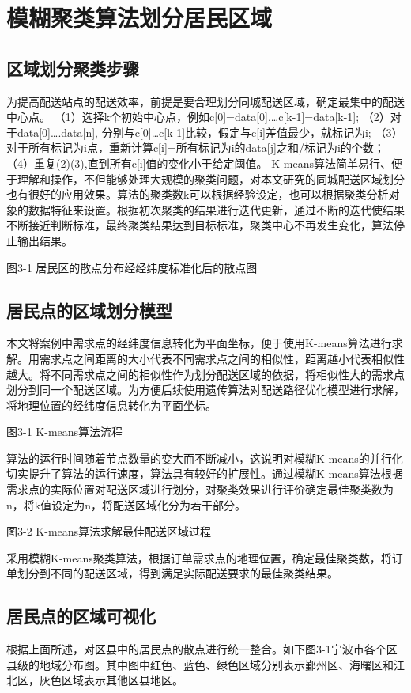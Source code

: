 \clearpage
\section{模糊聚类算法划分居民区域}

\subsection{区域划分聚类步骤}

为提高配送站点的配送效率，前提是要合理划分同城配送区域，确定最集中的配送中心点。
（1）选择k个初始中心点，例如c[0]=data[0],…c[k-1]=data[k-1];
（2）对于data[0]….data[n], 分别与c[0]…c[k-1]比较，假定与c[i]差值最少，就标记为i;
（3）对于所有标记为i点，重新计算c[i]={所有标记为i的data[j]之和}/标记为i的个数；
（4）重复(2)(3),直到所有c[i]值的变化小于给定阈值。
K-means算法简单易行、便于理解和操作，不但能够处理大规模的聚类问题，对本文研究的同城配送区域划分也有很好的应用效果。算法的聚类数k可以根据经验设定，也可以根据聚类分析对象的数据特征来设置。根据初次聚类的结果进行迭代更新，通过不断的迭代使结果不断接近判断标准，最终聚类结果达到目标标准，聚类中心不再发生变化，算法停止输出结果。

 
图3-1 居民区的散点分布经经纬度标准化后的散点图


\subsection{居民点的区域划分模型}

本文将案例中需求点的经纬度信息转化为平面坐标，便于使用K-means算法进行求解。用需求点之间距离的大小代表不同需求点之间的相似性，距离越小代表相似性越大。将不同需求点之间的相似性作为划分配送区域的依据，将相似性大的需求点划分到同一个配送区域。为方便后续使用遗传算法对配送路径优化模型进行求解，将地理位置的经纬度信息转化为平面坐标。
 

图3-1 K-means算法流程

算法的运行时间随着节点数量的变大而不断减小，这说明对模糊K-means的并行化切实提升了算法的运行速度，算法具有较好的扩展性。通过模糊K-means算法根据需求点的实际位置对配送区域进行划分，对聚类效果进行评价确定最佳聚类数为n，将k值设定为n，将配送区域化分为若干部分。

 
图3-2 K-means算法求解最佳配送区域过程

采用模糊K-means聚类算法，根据订单需求点的地理位置，确定最佳聚类数，将订单划分到不同的配送区域，得到满足实际配送要求的最佳聚类结果。

\subsection{居民点的区域可视化}
根据上面所述，对区县中的居民点的散点进行统一整合。如下图3-1宁波市各个区县级的地域分布图。其中图中红色、蓝色、绿色区域分别表示鄞州区、海曙区和江北区，灰色区域表示其他区县地区。
 
